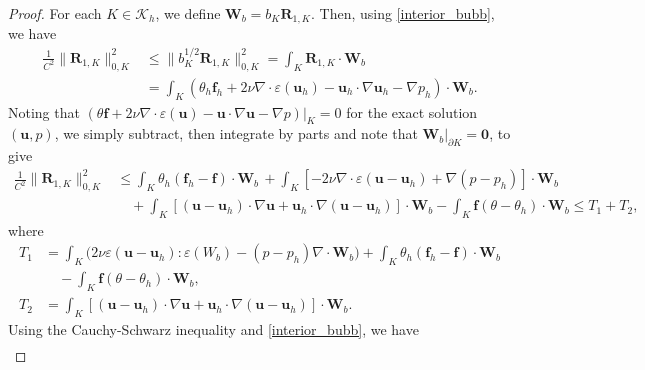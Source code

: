 \documentclass[10pt,a4paper]{article}
\begin{document}
\begin{proof}
    For each $K \in \mathcal{K}_h$, we define $\boldsymbol{W}_b = b_K \boldsymbol{R}_{1,K}$. Then, using \eqref{interior_bubb}, we have 
    \begin{align*}
    \frac{1}{C^2} \| \boldsymbol{R}_{1,K} \|_{0,K}^2 &\leq \| b_K^{1/2} \boldsymbol{R}_{1,K} \|^2_{0,K} = \int_K \boldsymbol{R}_{1,K} \cdot  \boldsymbol{W}_b  \\ & 
    = \int_K \left( \theta_h \boldsymbol{f}_h + 2 \nu \nabla \cdot \varepsilon (\boldsymbol{u}_h) - \boldsymbol{u}_h \cdot \nabla \boldsymbol{u}_h - \nabla p_h  \right) \cdot \boldsymbol{W}_b.
    \end{align*}
Noting that $\left( \theta \boldsymbol{f} + 2 \nu \nabla \cdot \varepsilon ( \boldsymbol{u}) - \boldsymbol{u} \cdot \nabla \boldsymbol{u} - \nabla p \right)|_K = 0$ for the exact solution $(\boldsymbol{u}, p)$, we simply subtract, then integrate by parts and note that $\boldsymbol{W}_b|_{\partial K} = \boldsymbol{0}$, to give
\begin{align*}
 \frac{1}{C^2} \| \boldsymbol{R}_{1,K} \|_{0,K}^2 &\leq \int_K \theta_h \left( \boldsymbol{f}_h - \boldsymbol{f} \right) \cdot \boldsymbol{W}_b \,  
    + \int_K \left[ -2 \nu \nabla \cdot \varepsilon  (\boldsymbol{u} - \boldsymbol{u}_h) + \nabla (p - p_h) \right] \cdot \boldsymbol{W}_b \,   \\ & \quad +  \int_K \left[  \left( \boldsymbol{u} - \boldsymbol{u}_h \right) \cdot \nabla  \boldsymbol{u} +  \boldsymbol{u}_h \cdot \nabla  \left( \boldsymbol{u} - \boldsymbol{u}_h \right) \right] \cdot \boldsymbol{W}_b - \int_K \boldsymbol{f} (\theta - \theta_h) \cdot \boldsymbol{W}_b \leq   T_1 + T_2,
\end{align*}
where 
\begin{align*}
      T_1 &= \int_K \bigg( 2 \nu \varepsilon (\boldsymbol{u}- \boldsymbol{u}_h ) :  \varepsilon ({W}_b) - (p-p_h) \nabla \cdot \boldsymbol{W}_b \bigg)  + \int_K  \theta_h ( \boldsymbol{f}_h - \boldsymbol{f} ) \cdot \boldsymbol{W}_b \\& \quad - \int_K \boldsymbol{f} (\theta - \theta_h) \cdot \boldsymbol{W}_b, \\
      T_2 &=  \int_K \left[ \left( \boldsymbol{u} - \boldsymbol{u}_h \right) \cdot \nabla  \boldsymbol{u} +  \boldsymbol{u}_h \cdot \nabla  \left( \boldsymbol{u} - \boldsymbol{u}_h \right) \right] \cdot \boldsymbol{W}_b .
\end{align*}
Using the Cauchy-Schwarz inequality and \eqref{interior_bubb}, we have 
\begin{align*}

\end{align*}
\end{proof}
\end{document}
